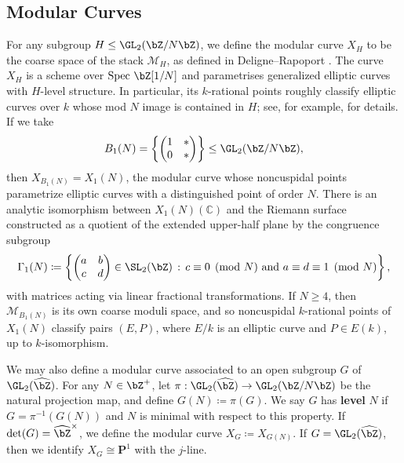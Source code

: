 \documentclass[11pt,reqno]{amsart}
\theoremstyle{plain}
\theoremstyle{definition}
\newcommand{\Z}{\bZ}
\newcommand{\PP}{\mathbf P}
\newcommand{\abbey}[1]{\textcolor{blue}{Abbey: #1}}
\newcommand{\abedit}[1]{{\color{blue} #1}}
\begin{document}
\subsection{Modular Curves}
For any subgroup $H \leq \GL_2(\Z/N\Z)$, we define the modular curve $X_H$ to be the coarse space of the stack $\mathcal{M}_H$, as defined in Deligne--Rapoport \cite{DR}. The curve $X_H$ is a scheme over $\text{Spec }\Z[1/N]$ and parametrises generalized elliptic curves with $H$-level structure. \abedit{In particular, its $k$-rational points roughly classify elliptic curves over $k$ whose mod $N$ image is contained in $H$}; see, for example, \cite[$\S2.3$]{RSZB2022} for details. If we take
\[
B_1(N) =\left\{ \begin{pmatrix}
1 & * \\
0 & *
\end{pmatrix} \right \} \leq \GL_2(\Z/N\Z),
\]
then $X_{B_1(N)}=X_1(N)$, the modular curve whose noncuspidal points parametrize  elliptic curves with a distinguished point of order $N$. There is an analytic isomorphism between $X_1(N)(\mathbb{C})$ and the Riemann surface constructed as a quotient of the extended upper-half plane by the congruence subgroup
\[
\Gamma_1(N) \coloneqq\left\{ \begin{pmatrix}
a & b \\
c & d 
\end{pmatrix} \in \SL_2(\Z) \, : \, c \equiv 0 \pmod{N} \text{ and } a \equiv d \equiv 1 \pmod{N} \right \}, 
\]
with matrices acting via linear fractional transformations. If $N \geq 4$, then $\mathcal{M}_{B_1(N)}$ is its own coarse moduli space, and so noncuspidal $k$-rational points of $X_1(N)$ classify pairs $(E,P)$, where $E/k$ is an elliptic curve and $P\in E(k)$, up to $k$-isomorphism. 

\abedit{We may also define a modular curve associated to an open subgroup $G$ of $\GL_2(\widehat{\Z})$. For any $N \in \Z^+$, let $\pi:\GL_2(\widehat{\Z}) \rightarrow \GL_2(\Z/N\Z)$ be the natural projection map, and define $G(N) \coloneqq \pi(G)$. We say $G$ has \textbf{level} $N$ if $G=\pi^{-1}(G(N))$ and $N$ is minimal with respect to this property.} If $\det(G)=\widehat{\Z}^{\times}$, we define the modular curve $X_G \coloneqq X_{G(N)}$. If $G=\GL_2(\widehat{\Z})$, then we identify $X_G \cong \PP^1$ with the $j$-line.
\end{document}
